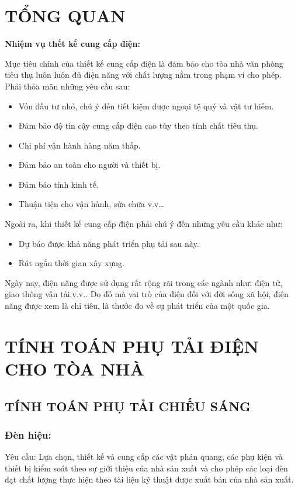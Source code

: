 \section{TỔNG QUAN}
\textbf{Nhiệm vụ thết kế cung cấp điện:}

Mục tiêu chính của thiết kế cung cấp điện là đảm bảo cho tòa nhà văn phòng tiêu thụ luôn luôn đủ điện năng với chất lượng nằm trong phạm vi cho phép. Phải thỏa mãn những yêu cầu sau:
\begin{itemize}
	\item Vốn đầu tư nhỏ, chú ý đến tiết kiệm được ngoại tệ quý và vật tư hiếm.
	\item Đảm bảo độ tin cậy cung cấp điện cao tùy theo tính chất tiêu thụ.
	\item Chi phí vận hành hàng năm thấp.
	\item Đảm bảo an toàn cho người và thiết bị.
	\item Đảm bảo tính kinh tế.
	\item Thuận tiện cho vận hành, sửa chữa v.v…
\end{itemize}

Ngoài ra, khi thiết kế cung cấp điện phải chú ý đến những yêu cầu khác như:
\begin{itemize}
	\item Dự báo được khả năng phát triển phụ tải sau này.
	\item Rút ngắn thời gian xây xựng.
\end{itemize}

Ngày nay, điện năng được sử dụng rất rộng rãi trong các ngành như: điện tử, giao thông vận tải.v.v.. Do đó mà vai trò của điện đối với đời sống xã hội, điện năng được xem là chỉ tiêu, là thước đo về sự phát triển của một quốc gia.

\section{TÍNH TOÁN PHỤ TẢI ĐIỆN CHO TÒA NHÀ}
\subsection{TÍNH TOÁN PHỤ TẢI CHIẾU SÁNG}
\subsubsection{Đèn hiệu:}
Yêu cầu: Lựa chọn, thiết kế và cung cấp các vật phản quang, các phụ kiện và thiết bị kiểm soát theo sự giới thiệu của nhà sản xuất và cho phép các loại đèn đạt chất lượng thực hiện theo tài liệu kỹ thuật được xuất bản của nhà sản xuất.
